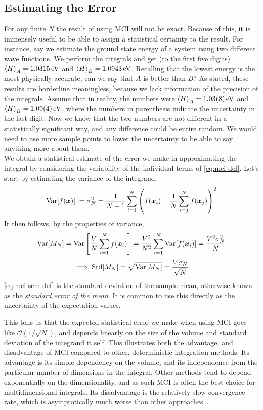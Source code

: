 \documentclass[Thesis.tex]{subfiles}
\begin{document}
\subsection{Estimating the Error}

For any finite $N$ the result of using MCI will not be exact. Because of this,
it is immensely useful to be able to assign a statistical certainty to the
result. For instance, say we estimate the ground state energy of a system using
two different wave functions. We perform the integrals and get (to the first
five digits) $\expval{H}_A = \SI{1.0315}{eV}$ and $\expval{H}_B =
\SI{1.0943}{eV}$. Recalling that the lowest energy is the most physically
accurate, can we say that $A$ is better than $B$? As stated, these results are
borderline meaningless, because we lack information of the precision of the
integrals. Assume that in reality, the numbers were
$\expval{H}_A=\SI{1.03(8)}{eV}$ and $\expval{H}_B=\SI{1.09(4)}{eV}$, where the
numbers in parenthesis indicate the uncertainty in the last digit. Now we know
that the two numbers are not different in a statistically significant way, and
any difference could be entire random. We would need to use more sample points
to lower the uncertainty to be able to say anything more about them.\\

We obtain a statistical estimate of the error we make in approximating the
integral by considering the variability of the individual terms of
\cref{eq:mci-def}. Let's start by estimating the variance of the integrand:
\begin{align}
    \operatorname{Var}[f(\bm{x})] \vcentcolon= \sigma^2_N = \frac{1}{N-1} \sum_{i=1}^N\qty(f(\bm{x}_i) - \frac{1}{N}\sum_{i=j}^N f(\bm{x}_j))^2
\end{align}
It then follows, by the properties of variance,
\begin{align}
  \label{eq:mci-annon-2}
    \operatorname{Var}[M_N] = \operatorname{Var}\qty[ \frac{V}{N} \sum_{i=1}^Nf(\bm{x}_i)] = \frac{V^2}{N^2}\sum_{i=1}^N\operatorname{Var}[f(\bm{x}_i)] = \frac{V^2\sigma^2_N}{N}
\end{align}
\begin{align}
  \label{eq:mci-sem-def}
    \implies \operatorname{Std}[M_N] = \sqrt{\operatorname{Var}[M_N]} = \frac{V\sigma_N}{\sqrt N}
\end{align}
\cref{eq:mci-sem-def} is the standard deviation of the sample mean, otherwise
known as the \emph{standard error of the mean}. It is common to use this
directly as the uncertainty of the expectation values.

This tells us that the expected statistical error we make when using MCI goes
like $\mathcal{O}(1 / \sqrt N)$, and depends linearly on the size of the volume
and standard deviation of the integrand it self. This illustrates both the
advantage, and disadvantage of MCI compared to other,
deterministic integration methods. Its advantage is its simple dependency on the
volume, and its independence from the particular number of dimensions in the
integral. Other methods tend to depend exponentially on the dimensionality, and
as such MCI is often the best choice for multidimensional integrals. Its
disadvantage is the relatively slow convergence rate, which is asymptotically
much worse than other approaches~\cite{Numerical-Recipes-Press-et-al}.
\end{document}
